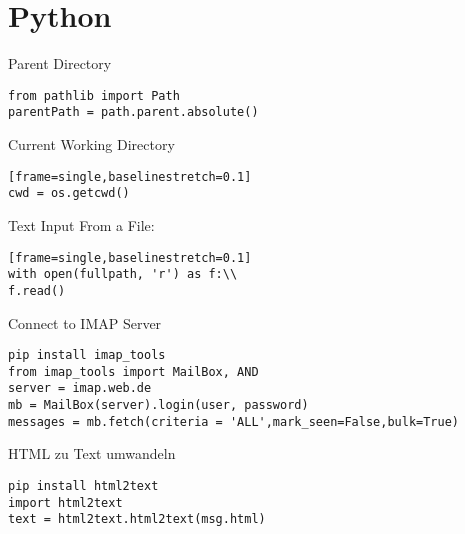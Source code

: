 \chapter{Python}\label{chap:Python}
Parent Directory
\begin{verbatim}
from pathlib import Path
parentPath = path.parent.absolute()
\end{verbatim}
Current Working Directory
\begin{verbatim}[frame=single,baselinestretch=0.1]
cwd = os.getcwd()
\end{verbatim}
Text Input From a File:
\begin{verbatim}[frame=single,baselinestretch=0.1]
with open(fullpath, 'r') as f:\\
f.read()
\end{verbatim}
Connect to IMAP Server
\begin{verbatim}
pip install imap_tools
from imap_tools import MailBox, AND
server = imap.web.de
mb = MailBox(server).login(user, password)
messages = mb.fetch(criteria = 'ALL',mark_seen=False,bulk=True)
\end{verbatim}
HTML zu Text umwandeln
\begin{verbatim}
pip install html2text
import html2text
text = html2text.html2text(msg.html)
\end{verbatim}